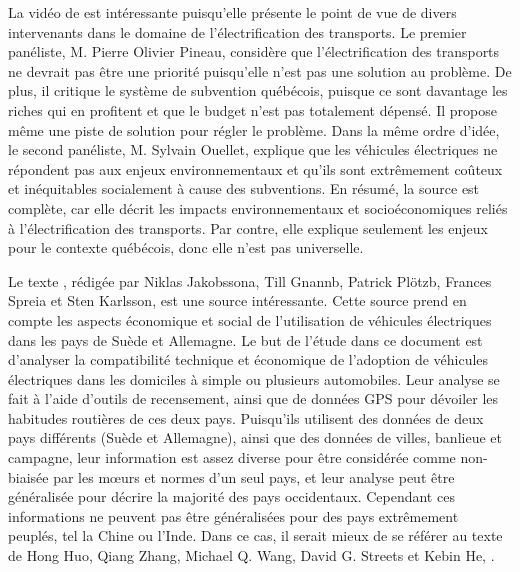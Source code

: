 La vidéo de  est intéressante puisqu’elle présente le point de vue de divers intervenants dans le domaine de l’électrification des transports. Le premier panéliste, M. Pierre Olivier Pineau, considère que l’électrification des transports ne devrait pas être une priorité puisqu’elle n’est pas une solution au problème. De plus, il critique le système de subvention québécois, puisque ce sont davantage les riches qui en profitent et que le budget n’est pas totalement dépensé. Il propose même une piste de solution pour régler le problème. Dans la même ordre d’idée, le second panéliste, M. Sylvain Ouellet, explique que les véhicules électriques ne répondent pas aux enjeux environnementaux et qu’ils sont extrêmement coûteux et inéquitables socialement à cause des subventions. En résumé, la source est complète, car elle décrit les impacts environnementaux et socioéconomiques reliés à l’électrification des transports. Par contre, elle explique seulement les enjeux pour le contexte québécois, donc elle n’est pas universelle.

Le texte , rédigée par Niklas Jakobssona, Till Gnannb, Patrick Plötzb, Frances Spreia et Sten Karlsson, est une source intéressante. Cette source prend en compte les aspects économique et social de l'utilisation de véhicules électriques dans les pays de Suède et Allemagne. Le but de l'étude dans ce document est d'analyser la compatibilité technique et économique de l'adoption de véhicules électriques dans les domiciles à simple ou plusieurs automobiles. Leur analyse se fait à l'aide d'outils de recensement, ainsi que de données GPS pour dévoiler les habitudes routières de ces deux pays. Puisqu'ils utilisent des données de deux pays différents (Suède et Allemagne), ainsi que des données de villes, banlieue et campagne, leur information est assez diverse pour être considérée comme non-biaisée par les m\oe urs et normes d'un seul pays, et leur analyse peut être généralisée pour décrire la majorité des pays occidentaux. Cependant ces informations ne peuvent pas être généralisées pour des pays extrêmement peuplés, tel la Chine ou l'Inde. Dans ce cas, il serait mieux de se référer au texte de Hong Huo, Qiang Zhang, Michael Q. Wang, David G. Streets et Kebin He, .


